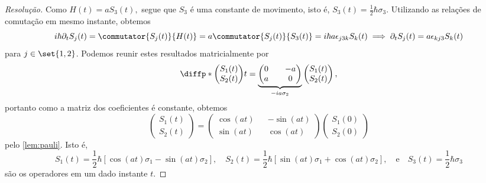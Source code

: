 \begin{proof}[Resolução]
    Como \(H(t) = a S_3(t),\) segue que \(S_3\) é uma constante de movimento, isto é, \(S_3(t) = \frac12 \hbar \sigma_3.\) Utilizando as relações de comutação em mesmo instante, obtemos
    \begin{equation*}
        i \hbar \partial_t S_j(t) = \commutator{S_j(t)}{H(t)} = a\commutator{S_j(t)}{S_3(t)} = i \hbar a \epsilon_{j3k}S_k(t) \implies \partial_t S_j(t) = a \epsilon_{kj3} S_k(t)
    \end{equation*}
    para \(j \in \set{1,2}\). Podemos reunir estes resultados matricialmente por
    \begin{equation*}
        \diffp*{\begin{pmatrix}
            S_1(t)\\
            S_2(t)
        \end{pmatrix}}{t} = \underbrace{\begin{pmatrix}
        0 && -a\\
        a && 0
    \end{pmatrix}}_{-ia \sigma_2} \begin{pmatrix}
            S_1(t)\\
            S_2(t)
        \end{pmatrix},
    \end{equation*}
    portanto como a matriz dos coeficientes é constante, obtemos
    \begin{equation*}
        \begin{pmatrix}
            S_1(t)\\
            S_2(t)
        \end{pmatrix} = \begin{pmatrix}
        \cos(at) && -\sin(at)\\
        \sin(at) && \cos(at)
        \end{pmatrix}
        \begin{pmatrix}
            S_1(0)\\
            S_2(0)
        \end{pmatrix}
    \end{equation*}
    pelo \cref{lem:pauli}. Isto é,
    \begin{equation*}
        S_1(t) = \frac12 \hbar \left[\cos(a t) \sigma_1 - \sin(a t) \sigma_2\right],
        \quad
        S_2(t) = \frac12 \hbar \left[\sin(a t) \sigma_1 + \cos(a t) \sigma_2\right],
        \quad\text{e}\quad
        S_3(t) = \frac12 \hbar \sigma_3
    \end{equation*}
    são os operadores em um dado instante \(t\).


\end{proof}
